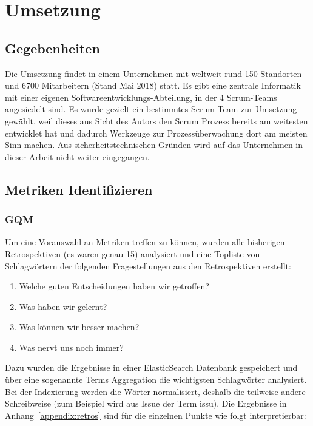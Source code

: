 \chapter{Umsetzung}

\section{Gegebenheiten}

Die Umsetzung findet in einem Unternehmen mit weltweit rund 150 Standorten und 6700 Mitarbeitern (Stand Mai 2018) statt.
Es gibt eine zentrale Informatik mit einer eigenen Softwareentwicklungs-Abteilung, in der 4 Scrum-Teams angesiedelt sind.
Es wurde gezielt ein bestimmtes Scrum Team zur Umsetzung gewählt, weil dieses aus Sicht des Autors den Scrum Prozess bereits am weitesten entwicklet hat und dadurch Werkzeuge zur Prozessüberwachung dort am meisten Sinn machen.
Aus sicherheitstechnischen Gründen wird auf das Unternehmen in dieser Arbeit nicht weiter eingegangen.

\newpage
\section{Metriken Identifizieren}

\subsection{\ac{GQM}}

Um eine Vorauswahl an Metriken treffen zu können, wurden alle bisherigen Retrospektiven (es waren genau 15) analysiert und eine Topliste von Schlagwörtern der folgenden Fragestellungen aus den Retrospektiven erstellt:
\begin{enumerate}
    \item Welche guten Entscheidungen haben wir getroffen?
    \item Was haben wir gelernt?
    \item Was können wir besser machen?
    \item Was nervt uns noch immer?
\end{enumerate}

Dazu wurden die Ergebnisse in einer ElasticSearch Datenbank gespeichert und über eine sogenannte Terms Aggregation die wichtigsten Schlagwörter analysiert.
Bei der Indexierung werden die Wörter normalisiert, deshalb die teilweise andere Schreibweise (zum Beispiel wird aus Issue der Term issu).
Die Ergebnisse in Anhang~\ref{appendix:retros} sind für die einzelnen Punkte wie folgt interpretierbar:

